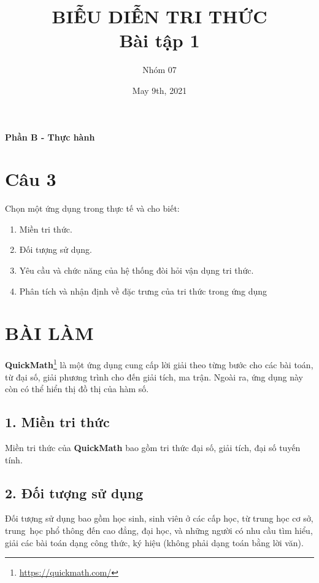 \documentclass{article}
\title{BIỄU DIỄN TRI THỨC\\ Bài tập 1}
\author{Nhóm 07}
\date{May 9th, 2021}
\begin{document}
\maketitle
\begin{center}
	\Large{\textbf{Phần B - Thực hành}}
\end{center}
\section*{Câu 3}	
Chọn một ứng dụng trong thực tế và cho biết:

\begin{enumerate} 
	\item Miền tri thức. 
	\item Đối tượng sử dụng. 
	\item Yêu cầu và chức năng của hệ thống đòi hỏi vận dụng tri thức. 
	\item Phân tích và nhận định về đặc trưng của tri thức trong ứng dụng
\end{enumerate}


\section*{BÀI LÀM}
\textbf{QuickMath}\footnote{\url{https://quickmath.com/}} là một ứng dụng cung cấp lời giải theo từng bước cho các bài toán, từ đại số, giải phương trình cho đến giải tích, ma trận. Ngoài ra, ứng dụng này còn có thể hiển thị đồ thị của hàm số.

\subsection* {1. Miền tri thức}
Miền tri thức của \textbf{QuickMath} bao gồm tri thức đại số, giải tích, đại số tuyến tính.

\subsection*{2. Đối tượng sử dụng}
Đối tượng sử dụng bao gồm học sinh, sinh viên ở các cấp học, từ trung học cơ sở, trung~học phổ thông đến cao đẳng, đại học, và những người có nhu cầu tìm hiểu, giải các bài toán dạng công thức, ký hiệu (không phải dạng toán bằng lời văn).
\end{document}
